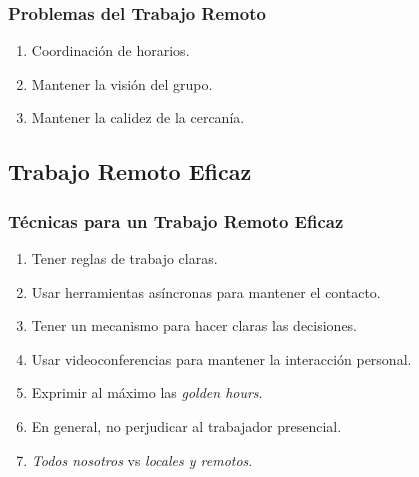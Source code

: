 \documentclass[a4paper,t,xcolor=pst,dvips]{beamer}
\begin{document}
\begin{frame}[c]
	\frametitle{Problemas del Trabajo Remoto}
	\begin{enumerate}[<+->]
        \item Coordinación de horarios.
        \item Mantener la visión del grupo.
        \item Mantener la calidez de la cercanía.
	\end{enumerate}
\end{frame}

\subsection{Trabajo Remoto Eficaz}

\begin{frame}[c]
	\frametitle{Técnicas para un Trabajo Remoto Eficaz}
	\begin{enumerate}[<+->]
        \item Tener reglas de trabajo claras.
        \item Usar herramientas asíncronas para mantener el contacto.
        \item Tener un mecanismo para hacer claras las decisiones.
        \item Usar videoconferencias para mantener la interacción personal.
        \item Exprimir al máximo las \emph{golden hours}.
        \item En general, no perjudicar al trabajador presencial.
        \item \emph{Todos nosotros} vs \emph{locales y remotos}.
	\end{enumerate}
\end{frame}

\end{document}
